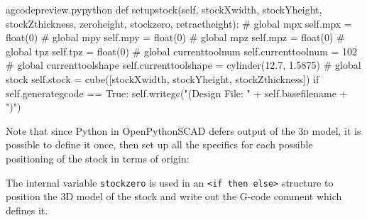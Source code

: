 \documentclass{ltxdoc}
\begin{document}
\lstset{firstnumber=\thegcpy}
\begin{writecode}{a}{gcodepreview.py}{python}
    def setupstock(self, stockXwidth,
                 stockYheight,
                 stockZthickness,
                 zeroheight,
                 stockzero,
                 retractheight):
#        global mpx
        self.mpx = float(0)
#        global mpy
        self.mpy = float(0)
#        global mpz
        self.mpz = float(0)
#        global tpz
        self.tpz = float(0)
#        global currenttoolnum
        self.currenttoolnum = 102
#        global currenttoolshape
        self.currenttoolshape = cylinder(12.7, 1.5875)
#        global stock
        self.stock = cube([stockXwidth, stockYheight, stockZthickness])
        if self.generategcode == True:
            self.writegc("(Design File: " + self.basefilename + ")")
\end{writecode}
\addtocounter{gcpy}{22}

Note that since Python in OpenPythonSCAD defers output of the \textsc{3d} model, it is possible to define it once, then set up all the specifics for each possible positioning of the stock in terms of origin:

The internal variable \verb|stockzero| is used in an \verb|<if then else>| structure to position the 3D model of the stock and write out the G-code comment which defines it. 
\end{document}
